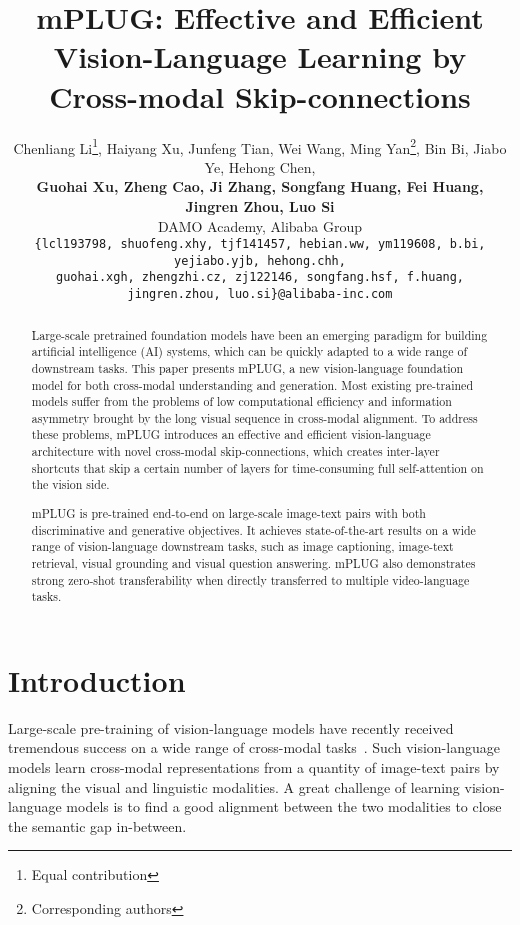 \documentclass[11pt]{article}
\title{mPLUG: Effective and Efficient Vision-Language Learning by Cross-modal Skip-connections}
\author{Chenliang Li\thanks{\hspace{2mm}Equal contribution}\hspace{1.5mm}, Haiyang Xu, Junfeng Tian, Wei Wang, Ming Yan\thanks{ Corresponding authors}\hspace{1.5mm}, Bin Bi, Jiabo Ye, Hehong Chen,\\\textbf{Guohai Xu, Zheng Cao, Ji Zhang, Songfang Huang, Fei Huang, Jingren Zhou, Luo Si} \\
  DAMO Academy, Alibaba Group \\
  {\small \texttt{\{lcl193798, shuofeng.xhy, tjf141457, hebian.ww, ym119608, b.bi, yejiabo.yjb, hehong.chh,}}\\
  {\small \texttt{guohai.xgh, zhengzhi.cz, zj122146, songfang.hsf, f.huang, jingren.zhou, luo.si\}@alibaba-inc.com}} \\}
\newcommand{\modelname}{mPLUG }
\begin{document}
\maketitle
\begin{abstract}
Large-scale pretrained foundation models have been an emerging paradigm for building artificial intelligence (AI) systems,  which can be quickly adapted to a wide range of downstream tasks. This paper presents mPLUG, a new vision-language foundation model for both cross-modal understanding and generation. Most existing pre-trained models suffer from the problems of low computational efficiency and information asymmetry brought by the long visual sequence in cross-modal alignment. To address these problems, \modelname introduces an effective and efficient vision-language architecture with novel cross-modal skip-connections, which creates inter-layer shortcuts that skip a certain number of layers for time-consuming full self-attention on the vision side.

\modelname is pre-trained end-to-end on large-scale image-text pairs with both discriminative and generative objectives. It achieves state-of-the-art results on a wide range of vision-language downstream tasks, such as image captioning, image-text retrieval, visual grounding and visual question answering. \modelname also demonstrates strong zero-shot transferability when directly transferred to multiple video-language tasks. 

\end{abstract}





\section{Introduction} Large-scale pre-training of vision-language models have recently received tremendous success on a wide range of cross-modal tasks~\cite{tan2019lxmert,chen2020uniter,huang2020pixel,li2020oscar,yu2021ernie,li2021align,wang2021simvlm}. Such vision-language models learn cross-modal representations from a quantity of image-text pairs by aligning the visual and linguistic modalities. A great challenge of learning vision-language models is to find a good alignment between the two modalities to close the semantic gap in-between.
\end{document}
